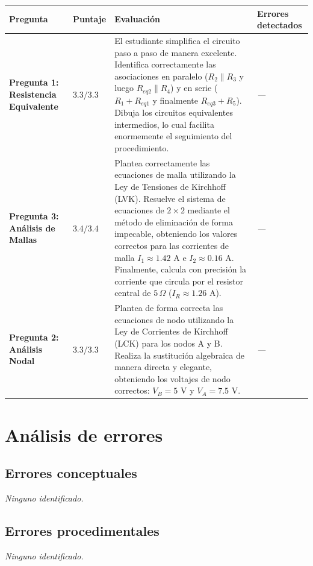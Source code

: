 \documentclass[11pt,a4paper]{article}
\begin{document}
\begin{longtable}{>{\bfseries}p{2.8cm} p{1.6cm} p{7.0cm} p{2.8cm}}
  \toprule
  \textbf{Pregunta} & \textbf{Puntaje} & \textbf{Evaluación} & \textbf{Errores detectados} \\
  \midrule
  \endhead
  \bottomrule
  \endfoot
    \textbf{Pregunta 1: Resistencia Equivalente} & 3.3/3.3 & El estudiante simplifica el circuito paso a paso de manera excelente. Identifica correctamente las asociaciones en paralelo ($R_2 \parallel R_3$ y luego $R_{eq2} \parallel R_4$) y en serie ($R_1 + R_{eq1}$ y finalmente $R_{eq3} + R_5$). Dibuja los circuitos equivalentes intermedios, lo cual facilita enormemente el seguimiento del procedimiento. & \textit{---} \\
    \midrule
    \textbf{Pregunta 3: Análisis de Mallas} & 3.4/3.4 & Plantea correctamente las ecuaciones de malla utilizando la Ley de Tensiones de Kirchhoff (LVK). Resuelve el sistema de ecuaciones de $2 \times 2$ mediante el método de eliminación de forma impecable, obteniendo los valores correctos para las corrientes de malla $I_1 \approx 1.42\text{ A}$ e $I_2 \approx 0.16\text{ A}$. Finalmente, calcula con precisión la corriente que circula por el resistor central de $5\,\Omega$ ($I_R \approx 1.26\text{ A}$). & \textit{---} \\
    \midrule
    \textbf{Pregunta 2: Análisis Nodal} & 3.3/3.3 & Plantea de forma correcta las ecuaciones de nodo utilizando la Ley de Corrientes de Kirchhoff (LCK) para los nodos A y B. Realiza la sustitución algebraica de manera directa y elegante, obteniendo los voltajes de nodo correctos: $V_B = 5\text{ V}$ y $V_A = 7.5\text{ V}$. & \textit{---} \\
    \midrule
\end{longtable}

\section*{Análisis de errores}

\subsection*{Errores conceptuales}
\textit{Ninguno identificado.}

\subsection*{Errores procedimentales}
\textit{Ninguno identificado.}
\end{document}
